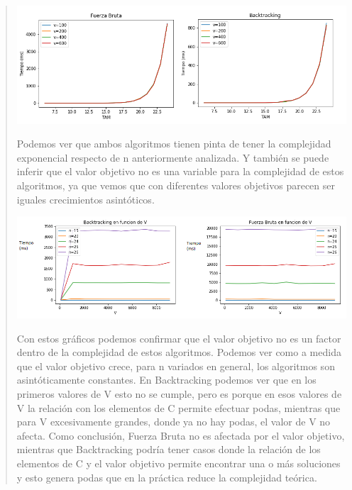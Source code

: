 \documentclass[8pt,a4paper]{article}
\begin{document}
\begin{verse}
\begin{center}
\includegraphics[scale=.7]{bf_var_v_plot.png}
\end{center}
Podemos ver que ambos algoritmos tienen pinta de tener la complejidad exponencial respecto de n anteriormente analizada. Y también se puede inferir que el valor objetivo no es una variable para la complejidad de estos algoritmos, ya que vemos que con diferentes valores objetivos parecen ser iguales crecimientos asintóticos.\\ 
\begin{center}
\includegraphics[scale=.7]{bt_bf_var_v.png}
\end{center}
Con estos gráficos podemos confirmar que el valor objetivo no es un factor dentro de la complejidad de estos algoritmos. Podemos ver como a medida que el valor objetivo crece, para n variados en general, los algoritmos son asintóticamente constantes. En Backtracking podemos ver que en los primeros valores de V esto no se cumple, pero es porque en esos valores de V la relación con los elementos de C permite efectuar podas, mientras que para V excesivamente grandes, donde ya no hay podas, el valor de V no afecta. Como conclusión, Fuerza Bruta no es afectada por el valor objetivo, mientras que Backtracking podría tener casos donde la relación de los elementos de C y el valor objetivo permite encontrar una o más soluciones y esto genera podas que en la práctica reduce la complejidad teórica.\\


\end{verse}
\end{document}
